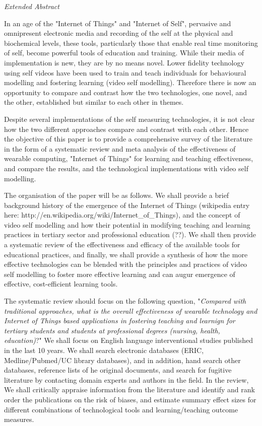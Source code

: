 \textit{Extended Abstract} 

In an age of the "Internet of Things" and "Internet of Self", pervasive and omnipresent electronic media and recording of the self at the physical and biochemical levels, these tools, particularly those that enable real time monitoring of self, become powerful tools of education and training. While their media of implementation is new, they are by no means novel. Lower fidelity technology using self videos have been used to train and teach individuals for behavioural modelling and fostering learning (video self modelling). Therefore there is now an opportunity to compare and contrast how the two technologies, one novel, and the other, established but similar to each other in themes. 

Despite several implementations of the self measuring technologies, it is not clear how the two different approaches compare and contrast with each other. Hence the objective of this paper is to provide a comprehensive survey of the literature in the form of a systematic review and meta analysis of the effectiveness of wearable computing, "Internet of Things" for learning and teaching effectiveness, and compare the results, and the technological implementations with video self modelling. 

The organisation of the paper will be as follows. We shall provide a brief background history of the emergence of the Internet of Things (wikipedia entry here: http://en.wikipedia.org/wiki/Internet_of_Things), and the concept of video self modelling and how their potential in modifying teaching and learning practices in tertiary sector and professional education (??). We shall then provide a systematic review of the effectiveness and efficacy of the available tools for educational practices, and finally, we shall provide a synthesis of how the more effective technologies can be blended with the principles and practices of video self modelling to foster more effective learning and can augur emergence of effective, cost-efficient learning tools.

The systematic review should focus on the following question, "\textit{Compared with traditional approaches, what is the overall effectiveness of wearable technology and Internet of Things based applications in fostering teaching and learnign for tertiary students and students at professional degrees (nursing, health, education)}?" We shall focus on English language interventional studies published in the last 10 years. We shall search electronic databases (ERIC, Medline/Pubmed/UC library databases), and in addition,  hand search other databases, reference lists of he original documents, and search for fugitive literature by contacting domain experts and authors in the field. In the review, We shall critically appraise information from the literature and identify and rank order the publications on the risk of biases, and estimate summary effect sizes for different combinations of technological tools and learning/teaching outcome measures. 

